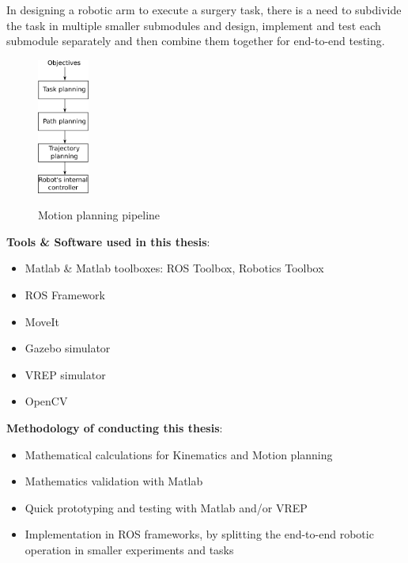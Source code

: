In designing a robotic arm to execute a surgery task, there is a need to subdivide the task in multiple smaller submodules and design, implement and test each submodule separately and then combine them together for end-to-end testing.

\begin{center}
\begin{figure}[!htb]
\centering
\includegraphics[width=0.15\textwidth]{images/motion-planning.png}\\
\caption{Motion planning pipeline}
\end{figure}
\end{center}

\textbf{Tools \& Software used in this thesis}:
\begin{itemize}
\item Matlab \& Matlab toolboxes: ROS Toolbox, Robotics Toolbox
\item ROS Framework
\item MoveIt
\item Gazebo simulator
\item VREP simulator
\item OpenCV
\end{itemize}

\textbf{Methodology of conducting this thesis}:
\begin{itemize}
\item Mathematical calculations for Kinematics and Motion planning
\item Mathematics validation with Matlab
\item Quick prototyping and testing with Matlab and/or VREP
\item Implementation in ROS frameworks, by splitting the end-to-end robotic operation in smaller experiments and tasks
\end{itemize}

